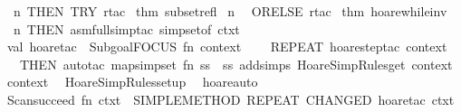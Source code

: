 \begin{isabellebody}
\endisaantiq
\ n\ THEN\ TRY\ {}rtac\ %
\isaantiq
thm\ subset{}refl{}%
\endisaantiq
\ n{}{}\isanewline
\ \ ORELSE\ {}rtac\ %
\isaantiq
thm\ hoare{}while{}inv{}%
\endisaantiq
\ n\ THEN\ asm{}full{}simp{}tac\ {}simpset{}of\ ctxt{}\ {}{}\isanewline
\isanewline
val\ hoare{}tac\ {}\ Subgoal{}FOCUS\ {}fn\ {}context{}\ {}{}{}{}\ {}{}\isanewline
\ \ REPEAT\ {}hoare{}step{}tac\ context\ {}{}\isanewline
\ \ THEN\ auto{}tac\ {}map{}simpset\ {}fn\ ss\ {}{}\ ss\ addsimps\ HoareSimpRules{}get\ context{}\ context{}{}\isanewline
\isanewline
{}\isanewline
\isanewline
{}\isamarkupfalse%
\ {}\ HoareSimpRules{}setup\ {}\isanewline
\isanewline
{}\isamarkupfalse%
\ hoare{}auto\ {}\ {}\isanewline
Scan{}succeed\ {}fn\ ctxt\ {}{}\ SIMPLE{}METHOD\ {}REPEAT\ {}CHANGED\ {}hoare{}tac\ ctxt\ {}{}{}{}{}\isanewline

\end{isabellebody}
